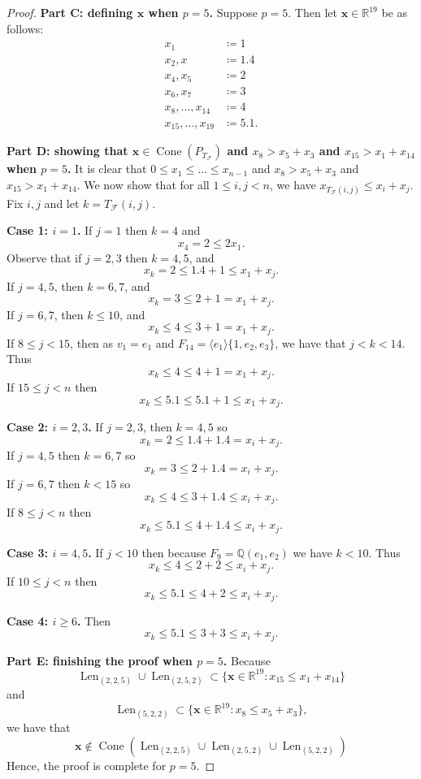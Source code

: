 \documentclass[10pt,a4paper]{amsart}
\DeclareMathOperator{\Cone}{Cone}
\DeclareMathOperator{\Len}{Len}
\newcommand{\QQ}{\mathbb{Q}}      %
\newcommand{\RR}{\mathbb{R}}      %
\newcommand{\cF}{\mathcal{F}}
\newcommand{\la}{\langle}
\newcommand{\ra}{\rangle}
\begin{document}
\begin{proof}
\noindent \textbf{Part C: defining $\mathbf{x}$ when $p = 5$.}
Suppose $p=5$. Then let $\mathbf{x} \in \RR^{19}$ be as follows:
\begin{align*}
x_1 &\coloneqq 1 \\
x_2,x &\coloneqq 1.4 \\
x_4,x_5 &\coloneqq 2 \\
x_6,x_7 &\coloneqq 3 \\
x_8,\dots,x_{14} &\coloneqq 4 \\
x_{15},\dots,x_{19} &\coloneqq 5.1.
\end{align*}

\noindent \textbf{Part D: showing that $\mathbf{x} \in \Cone(P_{T_{\cF}})$ and $x_8 > x_5 + x_3$ and $x_{15} > x_1 + x_{14}$ when $p = 5$.}
It is clear that $0 \leq x_1 \leq \dots \leq x_{n-1}$ and $x_8 > x_5 + x_3$ and $x_{15} > x_1 + x_{14}$. We now show that for all $1\leq i,j < n$, we have $x_{T_{\cF}(i,j)} \leq x_i + x_j$. Fix $i,j$ and let $k = T_{\cF}(i,j)$.

\noindent \textbf{Case 1: $i = 1$.} If $j = 1$ then $k = 4$ and 
\[
	x_4 = 2 \leq 2x_1.
\]
Observe that if $j = 2,3$ then $k = 4,5$, and
\[
	x_k = 2 \leq 1.4 + 1 \leq x_1 + x_j.
\]
If $j = 4,5$, then $k = 6,7$, and 
\[
	x_k = 3 \leq 2 + 1 = x_1 + x_j.
\]
If $j = 6,7$, then $k \leq 10$, and
\[
	x_k \leq 4 \leq 3 + 1 = x_1 + x_j.
\]
If $8 \leq j < 15$, then as $v_1 = e_1$ and $F_{14} = \la e_1 \ra \{ 1, e_2, e_3 \}$, we have that $j < k < 14$. Thus
\[
	x_k \leq 4 \leq 4 + 1 = x_1 + x_j.
\] 
If $15\leq j < n$ then
\[
	x_k \leq 5.1 \leq 5.1 + 1 \leq x_1 + x_j.
\]

\noindent \textbf{Case 2: $i = 2,3$.}
If $j = 2,3$, then $k = 4,5$ so 
\[
	x_k = 2 \leq 1.4 + 1.4 = x_i + x_j.
\]
If $j = 4,5$ then $k = 6,7$ so
\[
	x_k = 3 \leq 2 + 1.4 = x_i + x_j.
\]
If $j = 6,7$ then $k < 15$ so
\[
	x_k \leq 4 \leq 3 + 1.4 \leq x_i + x_j.
\]
If $8 \leq j < n$ then
\[
	x_k \leq 5.1 \leq 4 + 1.4 \leq x_i + x_j.
\]

\noindent \textbf{Case 3: $i = 4,5$.}
If $j < 10$ then because $F_9 = \QQ( e_1,e_2 )$ we have $k < 10$. Thus
\[
	x_k \leq 4 \leq 2 + 2 \leq x_i + x_j. 
\]
If $10 \leq j < n$ then
\[
	x_k \leq 5.1 \leq 4 + 2 \leq x_i + x_j.
\]

\noindent \textbf{Case 4: $i \geq 6$.}
Then 
\[
	x_k \leq 5.1 \leq 3 + 3 \leq x_i + x_j.
\]

\noindent \textbf{Part E: finishing the proof when $p = 5$.}
Because 
\[
	\Len_{(2,2,5)} \cup \Len_{(2,5,2)} \subset \{\mathbf{x} \in \RR^{19} : x_{15} \leq x_1 + x_{14} \}
\]
and
\[
	\Len_{(5,2,2)} \subset \{\mathbf{x} \in \RR^{19} : x_8 \leq x_5 + x_3 \},
\]
we have that 
\[
	\mathbf{x} \notin \Cone(\Len_{(2,2,5)} \cup \Len_{(2,5,2)} \cup \Len_{(5,2,2)})
\]
Hence, the proof is complete for $p = 5$.


\end{proof}
\end{document}
